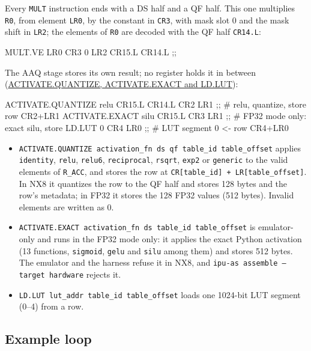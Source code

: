 \documentclass[11pt,a4paper]{article}
\newcommand{\doc}[2]{\href{https://rechefe.github.io/ipu-emulator/dev/#1/}{\textcolor{accent}{#2}}}
\begin{document}
Every \texttt{MULT} instruction ends with a DS half and a QF half. This one
multiplies \texttt{R0}, from element \texttt{LR0}, by the constant in
\texttt{CR3}, with mask slot 0 and the mask shift in \texttt{LR2}; the elements of
\texttt{R0} are decoded with the QF half \texttt{CR14.L}:

\begin{pycode}
    MULT.VE LR0 CR3 0 LR2 CR15.L CR14.L ;;
\end{pycode}

The AAQ stage stores its own result; no register holds it in between
(\doc{reference/isa/activate-quantize}{ACTIVATE.QUANTIZE, ACTIVATE.EXACT and LD.LUT}):

\begin{pycode}
    ACTIVATE.QUANTIZE relu CR15.L CR14.L CR2 LR1 ;; # relu, quantize, store row CR2+LR1
    ACTIVATE.EXACT silu CR15.L CR3 LR1 ;;           # FP32 mode only: exact silu, store
    LD.LUT 0 CR4 LR0 ;;                             # LUT segment 0 <- row CR4+LR0
\end{pycode}

\begin{itemize}
\item \texttt{ACTIVATE.QUANTIZE activation\_fn ds qf table\_id table\_offset}
  applies \texttt{identity}, \texttt{relu}, \texttt{relu6},
  \texttt{reciprocal}, \texttt{rsqrt}, \texttt{exp2} or \texttt{generic} to
  the valid elements of \texttt{R\_ACC}, and stores the row at
  \texttt{CR[table\_id] + LR[table\_offset]}. In NX8 it quantizes the row to
  the QF half and stores 128 bytes and the row's metadata; in FP32 it stores
  the 128 FP32 values (512 bytes). Invalid elements are written as 0.
\item \texttt{ACTIVATE.EXACT activation\_fn ds table\_id table\_offset} is
  emulator-only and runs in the FP32 mode only: it applies the exact Python
  activation (13 functions, \texttt{sigmoid}, \texttt{gelu} and \texttt{silu}
  among them) and stores 512 bytes. The emulator and the harness refuse it in
  NX8, and \texttt{ipu-as assemble --target hardware} rejects it.
\item \texttt{LD.LUT lut\_addr table\_id table\_offset} loads one 1024-bit LUT
  segment (0--4) from a row.
\end{itemize}

\needspace{7cm}
\subsection{Example loop}
\end{document}
